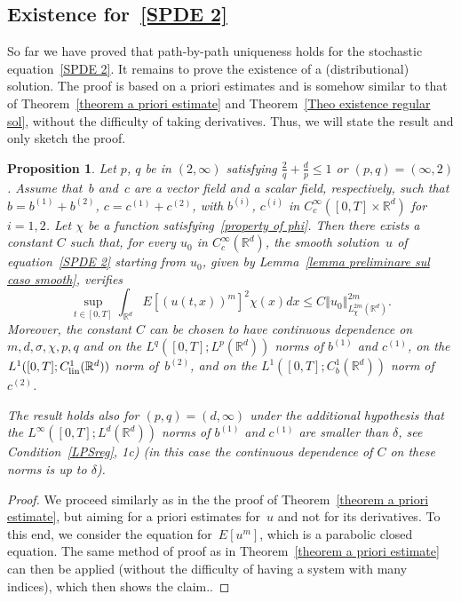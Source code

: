 \documentclass[a4paper,10pt]{article}
\newtheorem{proposition}[theorem]{Proposition}
\newcommand\1{\mathbbm{1}}
\newcommand\lin{{\rm lin}}
\numberwithin{equation}{section}
\begin{document}
\subsection{Existence for~\eqref{SPDE 2}}

So far we have proved that path-by-path uniqueness holds for the stochastic equation~\eqref{SPDE 2}. It remains to prove the existence of a (distributional) solution. The proof is based on a priori estimates and is somehow similar to that of Theorem~\ref{theorem a priori estimate} and Theorem~\ref{Theo existence regular sol}, without the difficulty of taking derivatives. Thus, we will state the result and only sketch the proof.

\begin{proposition}
Let $p$, $q$ be in $(2,\infty)$ satisfying $\frac2q+\frac{d}{p}\le1$ or $(p,q)=(\infty,2)$. Assume that~$b$ and~$c$ are a vector field and a scalar field, respectively, such that $b=b^{(1)}+b^{(2)}$, $c=c^{(1)}+c^{(2)}$, with $b^{(i)}$, $c^{(i)}$ in $C^\infty_c([0,T]\times\mathbb{R}^d)$ for $i=1,2$. Let $\chi$ be a function satisfying~\eqref{property of phi}. Then there exists a constant $C$ such that, for every $u_0$ in $C^\infty_c(\mathbb{R}^d)$, the smooth solution~$u$ of equation~\eqref{SPDE 2} starting from $u_0$, given by Lemma~\ref{lemma preliminare sul caso smooth}, verifies
\begin{equation*}
\sup_{t\in [0,T]  } \int_{\mathbb{R}^{d}}E\left[(u(t,x))^{m}\right]^{2}\chi(x) dx\leq C\left\Vert u_{0}\right\Vert_{L_{\chi}^{2m}(\mathbb{R}^{d})}^{2m}.
\end{equation*}
Moreover, the constant $C$ can be chosen to have continuous dependence on $m,d,\sigma,\chi,p,q$ and on the $L^q([0,T];L^p(\mathbb{R}^d))$ norms of $b^{(1)}$ and $c^{(1)}$, on the $L^1([0,T];C^1_{\lin}(\mathbb{R}^d))$ norm of~$b^{(2)}$, and on the $L^1([0,T];C^1_b(\mathbb{R}^d))$ norm of $c^{(2)}$.

The result holds also for $(p,q)=(d,\infty)$ under the additional hypothesis that the $L^\infty([0,T];L^d(\mathbb{R}^d))$ norms of $b^{(1)}$ and $c^{(1)}$ are smaller than $\delta$, see Condition~\ref{LPSreg}, \textup{1c)} \textup{(}in this case the continuous dependence of $C$ on these norms is up to $\delta$\textup{)}.
\end{proposition}

\begin{proof}
We proceed similarly as in the the proof of Theorem~\ref{theorem a priori estimate}, but aiming for a priori estimates for~$u$ and not for its derivatives. To this end, we consider the equation for~$E[u^m]$, which is a parabolic closed equation. The same method of proof as in Theorem~\ref{theorem a priori estimate} can then be applied (without the difficulty of having a system with many indices), which then shows the claim..
\end{proof}
\end{document}

